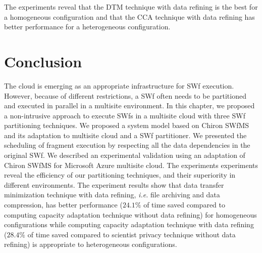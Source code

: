 The experiments reveal that the DTM technique with data refining is the best for a homogeneous configuration 
and that the CCA technique with data refining has better performance for a heterogeneous configuration.

\section{Conclusion}
\label{sec:SWEMCCon}

The cloud is emerging as an appropriate infrastructure for SWf execution. 
However, because of different restrictions, a SWf often
needs to be partitioned and executed in parallel in a multisite
environment.
In this chapter, we proposed a non-intrusive approach to execute SWfs in a multisite cloud with three SWf partitioning
techniques.
We proposed a system model based on Chiron SWfMS and its adaptation to
multisite cloud and a SWf partitioner.
We presented the scheduling of fragment execution by respecting all the data dependencies in the original SWf. 
We described an experimental validation using an adaptation of Chiron
SWfMS for Microsoft Azure multisite cloud.
The experiments experiments reveal the efficiency of our partitioning
techniques, and their superiority in different environments.
The experiment results show that data transfer minimization technique with data refining, \textit{i.e.} file archiving and data compression, has better performance ($24.1\%$ of time saved compared to computing capacity adaptation technique without data refining) for homogeneous configurations
while computing capacity adaptation technique with data refining ($28.4\%$ of time saved compared to scientist privacy technique without data refining) is appropriate to heterogeneous configurations. 
